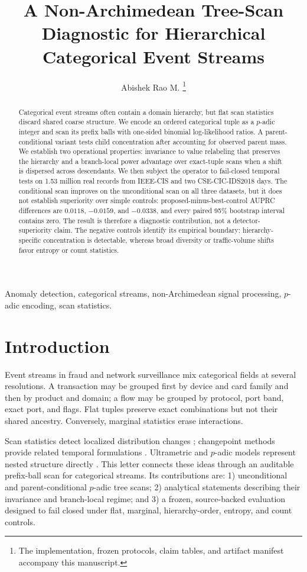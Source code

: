 \documentclass[journal]{IEEEtran}
\title{A Non-Archimedean Tree-Scan Diagnostic for Hierarchical Categorical Event Streams}
\author{Abishek Rao M.%
\thanks{The implementation, frozen protocols, claim tables, and artifact manifest accompany this manuscript.}}
\begin{document}
\maketitle

\begin{abstract}
Categorical event streams often contain a domain hierarchy, but flat scan statistics discard shared coarse structure. We encode an ordered categorical tuple as a $p$-adic integer and scan its prefix balls with one-sided binomial log-likelihood ratios. A parent-conditional variant tests child concentration after accounting for observed parent mass. We establish two operational properties: invariance to value relabeling that preserves the hierarchy and a branch-local power advantage over exact-tuple scans when a shift is dispersed across descendants. We then subject the operator to fail-closed temporal tests on 1.53 million real records from IEEE-CIS and two CSE-CIC-IDS2018 days. The conditional scan improves on the unconditional scan on all three datasets, but it does not establish superiority over simple controls: proposed-minus-best-control AUPRC differences are $0.0118$, $-0.0159$, and $-0.0338$, and every paired 95\% bootstrap interval contains zero. The result is therefore a diagnostic contribution, not a detector-superiority claim. The negative controls identify its empirical boundary: hierarchy-specific concentration is detectable, whereas broad diversity or traffic-volume shifts favor entropy or count statistics.
\end{abstract}

\begin{IEEEkeywords}
Anomaly detection, categorical streams, non-Archimedean signal processing, $p$-adic encoding, scan statistics.
\end{IEEEkeywords}

\section{Introduction}
Event streams in fraud and network surveillance mix categorical fields at several resolutions. A transaction may be grouped first by device and card family and then by product and domain; a flow may be grouped by protocol, port band, exact port, and flags. Flat tuples preserve exact combinations but not their shared ancestry. Conversely, marginal statistics erase interactions.

Scan statistics detect localized distribution changes \cite{neill2012fastsubset,rodner2016maxdiv}; changepoint methods provide related temporal formulations \cite{adams2007bocpd,laby2016mixedcusum}. Ultrametric and $p$-adic models represent nested structure directly \cite{ultrametriccommittee2012,khrennikov2023padicdbn}. This letter connects these ideas through an auditable prefix-ball scan for categorical streams. Its contributions are: 1) unconditional and parent-conditional $p$-adic tree scans; 2) analytical statements describing their invariance and branch-local regime; and 3) a frozen, source-backed evaluation designed to fail closed under flat, marginal, hierarchy-order, entropy, and count controls.
\end{document}
